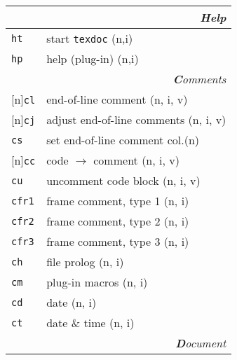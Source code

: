\documentclass[oneside,10pt,landscape,DIV17]{scrartcl}
\newcommand{\Rep}{{\scriptsize{[n]}}}
\newcommand{\Map}[1] {\textbf{\textasciiacute}\texttt{#1}}
\begin{document}
\begin{multicols}{3}
\begin{center}
\begin{tabular}[]{|p{11mm}|p{60mm}|}
\hline 
\multicolumn{2}{|r|}{\textsl{\textbf{H}elp}}\\[1.0ex]
\hline \Map{ht}   & start \texttt{texdoc}           \hfill (n,i)\\
\hline \Map{hp}   & help (plug-in)                  \hfill (n,i)\\
\hline 
\hline
\multicolumn{2}{|r|}{\textsl{\textbf{C}omments}}    \\[1.0ex]
\hline \Rep\Map{cl}   & end-of-line comment         \hfill (n, i, v)\\
\hline \Rep\Map{cj}   & adjust end-of-line comments \hfill (n, i, v)\\
\hline     \Map{cs}   & set end-of-line comment col.\hfill (n)      \\
%
\hline \Rep\Map{cc}   & code $\rightarrow$ comment  \hfill (n, i, v)\\
\hline     \Map{cu}   & uncomment code block        \hfill (n, i, v)\\
%
\hline     \Map{cfr1} & frame comment, type 1       \hfill (n, i)   \\
\hline     \Map{cfr2} & frame comment, type 2       \hfill (n, i)   \\
\hline     \Map{cfr3} & frame comment, type 3       \hfill (n, i)   \\
\hline     \Map{ch}   & file prolog                 \hfill (n, i)   \\
\hline     \Map{cm}   & plug-in macros              \hfill (n, i)   \\
\hline     \Map{cd}   & date                        \hfill (n, i)   \\
\hline     \Map{ct}   & date \& time                \hfill (n, i)   \\
\hline
\hline
\multicolumn{2}{|r|}{\textsl{\textbf{D}ocument}}                 \\[1.0ex]

\end{tabular}
\end{center}
\end{multicols}
\end{document}
